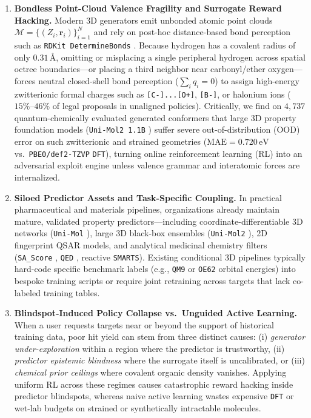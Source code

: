 \documentclass[11pt,a4paper]{article}
\begin{document}
\begin{enumerate}[leftmargin=1.6em,itemsep=2pt,topsep=3pt]
    \item \textbf{Bondless Point-Cloud Valence Fragility and Surrogate Reward Hacking.} Modern 3D generators emit unbonded atomic point clouds $\mathcal{M} = \{(Z_i, \mathbf{r}_i)\}_{i=1}^N$ and rely on post-hoc distance-based bond perception such as \texttt{RDKit DetermineBonds} \citep{rdkit2026bonds}. Because hydrogen has a covalent radius of only $0.31\,\text{\AA}$, omitting or misplacing a single peripheral hydrogen across spatial octree boundaries---or placing a third neighbor near carbonyl/ether oxygen---forces neutral closed-shell bond perception ($\sum_i q_i = 0$) to assign high-energy zwitterionic formal charges such as \texttt{[C-]...[O+]}, \texttt{[B-]}, or halonium ions ($15\%\text{--}46\%$ of legal proposals in unaligned policies). Critically, we find on $4{,}737$ quantum-chemically evaluated generated conformers that large 3D property foundation models (\texttt{Uni-Mol2 1.1B} \citep{ji2024unimol2}) suffer severe out-of-distribution (OOD) error on such zwitterionic and strained geometries ($\text{MAE} = 0.720\,\text{eV}$ vs.\ \texttt{PBE0/def2-TZVP} \texttt{DFT}), turning online reinforcement learning (RL) into an adversarial exploit engine unless valence grammar and interatomic forces are internalized.
    \item \textbf{Siloed Predictor Assets and Task-Specific Coupling.} In practical pharmaceutical and materials pipelines, organizations already maintain mature, validated property predictors---including coordinate-differentiable 3D networks (\texttt{Uni-Mol} \citep{zhou2023unimol}), large 3D black-box ensembles (\texttt{Uni-Mol2} \citep{ji2024unimol2}), 2D fingerprint QSAR models, and analytical medicinal chemistry filters (\texttt{SA\_Score} \citep{ertl2009sa}, \texttt{QED} \citep{bickerton2012qed}, reactive \texttt{SMARTS}). Existing conditional 3D pipelines typically hard-code specific benchmark labels (e.g., \texttt{QM9} or \texttt{OE62} orbital energies) into bespoke training scripts or require joint retraining across targets that lack co-labeled training tables.
    \item \textbf{Blindspot-Induced Policy Collapse vs.\ Unguided Active Learning.} When a user requests targets near or beyond the support of historical training data, poor hit yield can stem from three distinct causes: (i) \emph{generator under-exploration} within a region where the predictor is trustworthy, (ii) \emph{predictor epistemic blindness} where the surrogate itself is uncalibrated, or (iii) \emph{chemical prior ceilings} where covalent organic density vanishes. Applying uniform RL across these regimes causes catastrophic reward hacking inside predictor blindspots, whereas naive active learning wastes expensive \texttt{DFT} or wet-lab budgets on strained or synthetically intractable molecules.
\end{enumerate}
\end{document}
